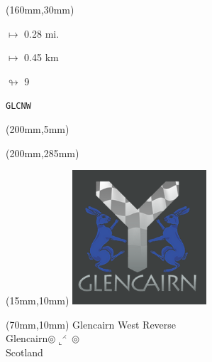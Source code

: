 \begin{textblock*}{40mm}(160mm,30mm)%
\Large
\par$\mapsto$ 0.28 mi.
\par$\mapsto$ 0.45 km
\par$\looparrowright$ 9
\par\hfill\tiny\tt GLCNW\\
\end{textblock*}
\begin{textblock*}{20mm}(200mm,5mm)%
\fbox{\thepage}
\label{GLCNW}
\end{textblock*}
\begin{textblock*}{20mm}(200mm,285mm)%
\fbox{\thepage}
\end{textblock*}

\null\newpage
\begin{textblock*}{50mm}(15mm,10mm)%
\includegraphics[width=50mm]{LG/GLCN.png}
\end{textblock*}
\begin{textblock*}{130mm}(70mm,10mm)%
{\fontsize{20}{20}\selectfont Glencairn West Reverse\\}
{\fontsize{16}{16}\selectfont Glencairn\hfill $\circledcirc\llcorner^{\rightthreetimes}\circledcirc$\\}
{\fontsize{12}{12}\selectfont Scotland\\}
\end{textblock*}
